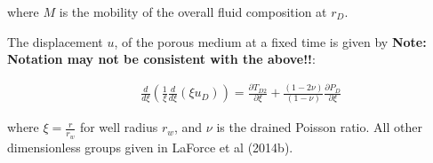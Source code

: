 \documentclass[12pt]{report}
\begin{document}
\noindent where $M$ is the mobility of the overall fluid composition
at $r_D$.

The displacement $u$, of the porous medium at a fixed time is given by
{\bf Note: Notation may not be consistent with the above!!}:

\begin{eqnarray}
&&\frac{d}{d \xi}\left(\frac{1}{\xi}\frac{d}{d \xi}(\xi u_D)\right) = \frac{\partial T_{D2}}{\partial \xi}+
\frac{(1-2\nu)}{(1-\nu)}\frac{\partial P_D}{\partial \xi}\label{eqn:disp_u}
\end{eqnarray}

\noindent where $\xi = \frac{r}{r_w}$ for well radius $r_w$, and $\nu$ is the drained Poisson ratio.  All other dimensionless groups given in LaForce et al (2014b).


\end{document}
